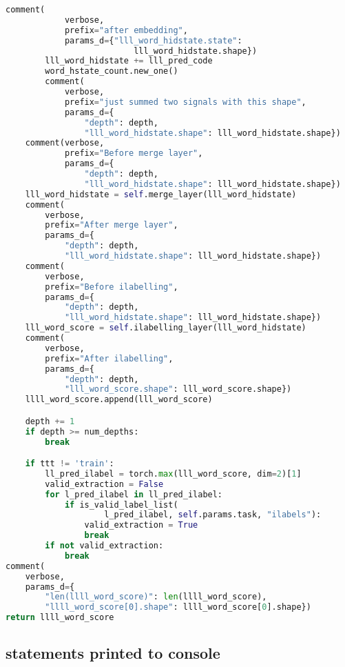 \documentclass[12pt]{article}
\begin{document}
\begin{lstlisting}[language=Python]
        comment(
            verbose,
            prefix="after embedding",
            params_d={"lll_word_hidstate.state":
                          lll_word_hidstate.shape})
        lll_word_hidstate += lll_pred_code
        word_hstate_count.new_one()
        comment(
            verbose,
            prefix="just summed two signals with this shape",
            params_d={
                "depth": depth,
                "lll_word_hidstate.shape": lll_word_hidstate.shape})
    comment(verbose,
            prefix="Before merge layer",
            params_d={
                "depth": depth,
                "lll_word_hidstate.shape": lll_word_hidstate.shape})
    lll_word_hidstate = self.merge_layer(lll_word_hidstate)
    comment(
        verbose,
        prefix="After merge layer",
        params_d={
            "depth": depth,
            "lll_word_hidstate.shape": lll_word_hidstate.shape})
    comment(
        verbose,
        prefix="Before ilabelling",
        params_d={
            "depth": depth,
            "lll_word_hidstate.shape": lll_word_hidstate.shape})
    lll_word_score = self.ilabelling_layer(lll_word_hidstate)
    comment(
        verbose,
        prefix="After ilabelling",
        params_d={
            "depth": depth,
            "lll_word_score.shape": lll_word_score.shape})
    llll_word_score.append(lll_word_score)

    depth += 1
    if depth >= num_depths:
        break

    if ttt != 'train':
        ll_pred_ilabel = torch.max(lll_word_score, dim=2)[1]
        valid_extraction = False
        for l_pred_ilabel in ll_pred_ilabel:
            if is_valid_label_list(
                    l_pred_ilabel, self.params.task, "ilabels"):
                valid_extraction = True
                break
        if not valid_extraction:
            break
comment(
    verbose,
    params_d={
        "len(llll_word_score)": len(llll_word_score),
        "llll_word_score[0].shape": llll_word_score[0].shape})
return llll_word_score
\end{lstlisting}


\subsection{statements printed to console}
\end{document}
